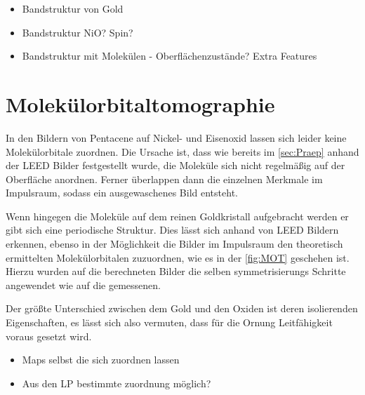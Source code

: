         \begin{itemize}
            \item Bandstruktur von Gold
            \item Bandstruktur NiO? Spin?
            \item Bandstruktur mit Molekülen - Oberflächenzustände? Extra Features
        \end{itemize}

    \section{Molekülorbitaltomographie}
        In den Bildern von Pentacene auf Nickel- und Eisenoxid lassen sich leider keine Molekülorbitale zuordnen.
        Die Ursache ist, dass wie bereits im \autoref{sec:Praep} anhand der LEED Bilder festgestellt wurde, die Moleküle sich nicht regelmäßig auf der Oberfläche anordnen.
        Ferner überlappen dann die einzelnen Merkmale im Impulsraum, sodass ein ausgewaschenes Bild entsteht.

        Wenn hingegen die Moleküle auf dem reinen Goldkristall aufgebracht werden er gibt sich eine periodische Struktur.
        Dies lässt sich anhand von LEED Bildern erkennen, ebenso in der Möglichkeit die Bilder im Impulsraum den theoretisch ermittelten Molekülorbitalen zuzuordnen, wie es in der \autoref{fig:MOT} geschehen ist.
        Hierzu wurden auf die berechneten Bilder die selben symmetrisierungs Schritte angewendet wie auf die gemessenen.

        Der größte Unterschied zwischen dem Gold und den Oxiden ist deren isolierenden Eigenschaften, es lässt sich also vermuten, dass für die Ornung Leitfähigkeit voraus gesetzt wird.


        \begin{itemize}
            \item Maps selbst die sich zuordnen lassen
            \item Aus den LP bestimmte zuordnung möglich?
        \end{itemize}

